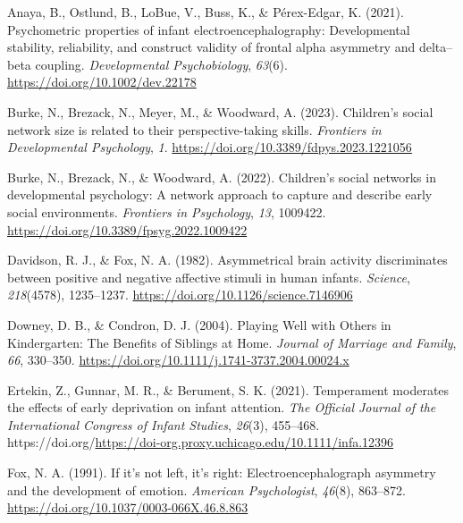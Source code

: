 \documentclass[
  man,
  floatsintext,
  longtable,
  nolmodern,
  notxfonts,
  notimes,
  colorlinks=true,linkcolor=blue,citecolor=blue,urlcolor=blue]{apa7}
\newlength{\cslhangindent}
\newenvironment{CSLReferences}[2] %
 {\begin{list}{}{%
  \setlength{\itemindent}{0pt}
  \setlength{\leftmargin}{0pt}
  \setlength{\parsep}{0pt}
  \ifodd #1
   \setlength{\leftmargin}{\cslhangindent}
   \setlength{\itemindent}{-1\cslhangindent}
  \fi
  \setlength{\itemsep}{#2\baselineskip}}}
 {\end{list}}
\begin{document}
\label{refs}
\begin{CSLReferences}{1}{0}
Anaya, B., Ostlund, B., LoBue, V., Buss, K., \& Pérex-Edgar, K. (2021).
Psychometric properties of infant electroencephalography:
{Developmental} stability, reliability, and construct validity of
frontal alpha asymmetry and delta--beta coupling. \emph{Developmental
Psychobiology}, \emph{63}(6). \url{https://doi.org/10.1002/dev.22178}

Burke, N., Brezack, N., Meyer, M., \& Woodward, A. (2023). Children's
social network size is related to their perspective-taking skills.
\emph{Frontiers in Developmental Psychology}, \emph{1}.
\url{https://doi.org/10.3389/fdpys.2023.1221056}

Burke, N., Brezack, N., \& Woodward, A. (2022). Children's social
networks in developmental psychology: {A} network approach to capture
and describe early social environments. \emph{Frontiers in Psychology},
\emph{13}, 1009422. \url{https://doi.org/10.3389/fpsyg.2022.1009422}

Davidson, R. J., \& Fox, N. A. (1982). Asymmetrical brain activity
discriminates between positive and negative affective stimuli in human
infants. \emph{Science}, \emph{218}(4578), 1235--1237.
\url{https://doi.org/10.1126/science.7146906}

Downey, D. B., \& Condron, D. J. (2004). Playing {Well} with {Others} in
{Kindergarten}: {The Benefits} of {Siblings} at {Home}. \emph{Journal of
Marriage and Family}, \emph{66}, 330--350.
\url{https://doi.org/10.1111/j.1741-3737.2004.00024.x}

Ertekin, Z., Gunnar, M. R., \& Berument, S. K. (2021). Temperament
moderates the effects of early deprivation on infant attention.
\emph{The Official Journal of the International Congress of Infant
Studies}, \emph{26}(3), 455--468.
https://doi.org/\url{https://doi-org.proxy.uchicago.edu/10.1111/infa.12396}

Fox, N. A. (1991). If it's not left, it's right: {Electroencephalograph}
asymmetry and the development of emotion. \emph{American Psychologist},
\emph{46}(8), 863--872. \url{https://doi.org/10.1037/0003-066X.46.8.863}


\end{CSLReferences}
\end{document}

